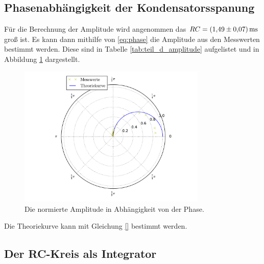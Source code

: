 \subsection{Phasenabhängigkeit der Kondensatorsspanung}

Für die Berechnung der Amplitude wird angenommen das $RC=\SI{1.49\pm0.07}{\milli\second}$
groß ist. Es kann dann mithilfe von \eqref{eq:phase} die Amplitude aus den Messwerten bestimmt werden.
Diese sind in Tabelle \ref{tab:teil_d_amplitude} aufgelistet und in Abbildung \ref{fig:plot_teil_d} dargestellt.
\FloatBarrier

\FloatBarrier
\FloatBarrier
\begin{figure}
  \centering
  \includegraphics[width=0.8\textwidth]{pics/polarplot.pdf}
  \caption{Die normierte Amplitude in Abhängigkeit von der Phase.}
  \label{fig:plot_teil_d}
\end{figure}
\FloatBarrier

Die Theoriekurve kann mit Gleichung \eqref{} bestimmt werden.

\subsection{Der RC-Kreis als Integrator}

